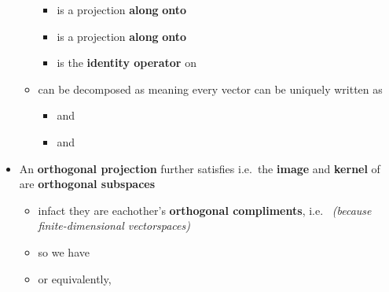 \begin{itemize}
\begin{itemize}
\begin{itemize}
                              \item
                                    \iMbox{\pi} is a projection \textbf{along}  \textbf{onto}
                              \item
                                    \iMbox{\pi^{*}} is a projection \textbf{along} 
                                    \textbf{onto} 
                              \item
                                    \iMbox{\pi^{*}} is the \textbf{identity operator} on 
                        \end{itemize}
                  \item
                         can be decomposed as  meaning every
                        vector  can be uniquely written as 

                        \begin{itemize}

                              \item
                                     and 
                              \item
                                     and
                        \end{itemize}
            \end{itemize}
      \item
            An \textbf{orthogonal projection} further satisfies 
            i.e.~the \textbf{image} and \textbf{kernel} of \iMbox{\pi} are
            \textbf{orthogonal subspaces}

            \begin{itemize}

                  \item
                        infact they are eachother's \textbf{orthogonal compliments},
                        i.e.~ \emph{(because
                              finite-dimensional vectorspaces)}
                  \item
                        so we have
                  \item
                        or equivalently,
            \end{itemize}
\end{itemize}

